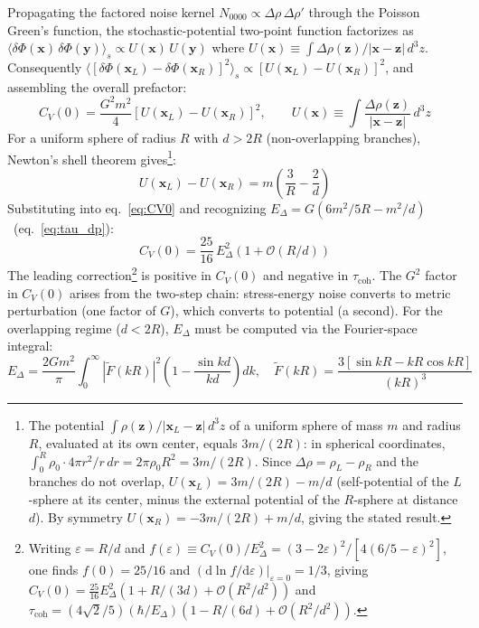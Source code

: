 \documentclass[12pt,a4paper]{article}
\begin{document}
Propagating the factored noise kernel $N_{0000}\propto\Delta\rho\,\Delta\rho'$
through the Poisson Green's function, the stochastic-potential two-point function
factorizes as $\langle\delta\Phi(\mathbf{x})\,\delta\Phi(\mathbf{y})\rangle_s \propto U(\mathbf{x})\,U(\mathbf{y})$
where $U(\mathbf{x})\equiv \int\Delta\rho(\mathbf{z})/|\mathbf{x}-\mathbf{z}|\,d^3z$.
Consequently $\langle[\delta\Phi(\mathbf{x}_L)-\delta\Phi(\mathbf{x}_R)]^2\rangle_s
\propto [U(\mathbf{x}_L)-U(\mathbf{x}_R)]^2$, and assembling the overall prefactor:
\begin{equation}
C_V(0) = \frac{G^2 m^2}{4}\!\left[U(\mathbf{x}_L) - U(\mathbf{x}_R)\right]^2, \qquad
U(\mathbf{x}) \equiv \int\frac{\Delta\rho(\mathbf{z})}{|\mathbf{x}-\mathbf{z}|}\,d^3z
\label{eq:CV0}
\end{equation}
For a uniform sphere of radius $R$ with $d > 2R$ (non-overlapping branches), Newton's
shell theorem gives\footnote{The potential
$\int\rho(\mathbf{z})/|\mathbf{x}_L - \mathbf{z}|\,d^3z$ of a uniform sphere of mass $m$
and radius $R$, evaluated at its own center, equals $3m/(2R)$: in spherical coordinates,
$\int_0^R \rho_0 \cdot 4\pi r^2/r\,dr = 2\pi\rho_0 R^2 = 3m/(2R)$.  Since
$\Delta\rho = \rho_L - \rho_R$ and the branches do not overlap,
$U(\mathbf{x}_L) = 3m/(2R) - m/d$ (self-potential of the $L$-sphere at its center, minus
the external potential of the $R$-sphere at distance $d$). By symmetry
$U(\mathbf{x}_R) = -3m/(2R) + m/d$, giving the stated result.}:
\begin{equation}
U(\mathbf{x}_L) - U(\mathbf{x}_R) = m\!\left(\frac{3}{R} - \frac{2}{d}\right)
\end{equation}
Substituting into eq.~\eqref{eq:CV0} and recognizing
$E_\Delta = G(6m^2/5R - m^2/d)$~(eq.~\ref{eq:tau_dp}):
\begin{equation}
C_V(0) = \frac{25}{16}\,E_\Delta^2\left(1 + \mathcal{O}(R/d)\right)
\label{eq:CV0_sphere}
\end{equation}
\noindent
The leading correction\footnote{Writing $\varepsilon = R/d$ and
$f(\varepsilon) \equiv C_V(0)/E_\Delta^2 = (3-2\varepsilon)^2/[4(6/5-\varepsilon)^2]$,
one finds $f(0) = 25/16$ and $(\mathrm{d}\ln f/\mathrm{d}\varepsilon)|_{\varepsilon=0} = 1/3$, giving
$C_V(0) = \tfrac{25}{16}E_\Delta^2(1 + R/(3d) + \mathcal{O}(R^2/d^2))$ and
$\tau_{\text{coh}} = (4\sqrt{2}/5)(\hbar/E_\Delta)(1 - R/(6d) + \mathcal{O}(R^2/d^2))$.}
is positive in $C_V(0)$ and negative in $\tau_{\text{coh}}$.
The $G^2$ factor in $C_V(0)$ arises from the two-step chain: stress-energy noise converts
to metric perturbation (one factor of $G$), which converts to potential (a second). For
the overlapping regime ($d < 2R$), $E_\Delta$ must be computed via the Fourier-space
integral:
\begin{equation}
E_\Delta = \frac{2Gm^2}{\pi}\int_0^\infty|\tilde{F}(kR)|^2\!\left(1-\frac{\sin kd}{kd}\right)dk, \quad
\tilde{F}(kR) = \frac{3[\sin kR - kR\cos kR]}{(kR)^3}
\label{eq:E_delta_fourier}
\end{equation}
\end{document}
